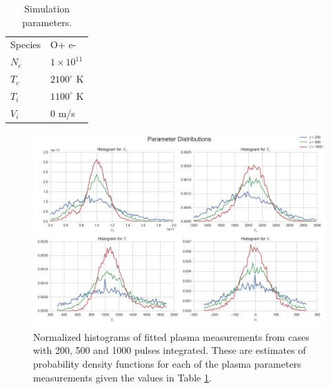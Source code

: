 \begin{table}[!t]
\centering
\caption{Simulation parameters.}
\label{tb:param1}
\begin{tabular}{ll}
Species & O+ e-\\
$N_e$    & $1\times 10^{11}$ \\
$T_e$      & $2100^\circ$ K   \\
$T_i$      & $1100^\circ$ K \\
$V_i$      & $0$ m/s
\end{tabular}
\end{table}

\begin{figure}[!t]
\centering
\includegraphics[width=5in]{datahist}
\caption{Normalized histograms of fitted plasma measurements from cases with 200, 500 and 1000 pulses integrated. These are estimates of probability density functions for each of the plasma parameters measurements given the values in Table \ref{tb:param1}.}
\label{fig:statshistall}
\end{figure}


